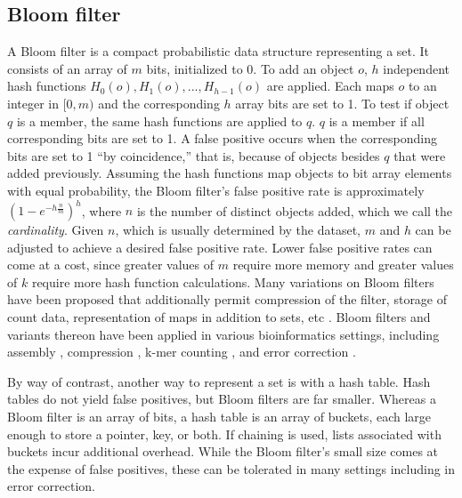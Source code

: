 \documentclass[10pt]{article}
\begin{document}
\subsection*{Bloom filter}
A Bloom filter \cite{bloom1970space} is a compact probabilistic data structure representing a set.  It consists of an array of $m$ bits, initialized to 0.  To add an object $o$, $h$ independent hash functions $H_0(o), H_1(o),...,H_{h-1}(o)$ are applied.  Each maps $o$ to an integer in $[0, m)$ and the corresponding $h$ array bits are set to 1. To test if object $q$ is a member, the same hash functions are applied to $q$.  $q$ is a member if all corresponding bits are set to 1.  A false positive occurs when the corresponding bits are set to 1 ``by coincidence,'' that is, because of objects besides $q$ that were added previously.  Assuming the hash functions map objects to bit array elements with equal probability, the Bloom filter's false positive rate is approximately $(1-e^{-h\frac{n}{m}})^h$, where $n$ is the number of distinct objects added, which we call the \emph{cardinality}.  Given $n$, which is usually determined by the dataset, $m$ and $h$ can be adjusted to achieve a desired false positive rate.  Lower false positive rates can come at a cost, since greater values of $m$ require more memory and greater values of $k$ require more hash function calculations.  Many variations on Bloom filters have been proposed that additionally permit compression of the filter, storage of count data, representation of maps in addition to sets, etc \cite{tarkoma2012theory}.  Bloom filters and variants thereon have been applied in various bioinformatics settings, including assembly \cite{pell2012scaling}, compression \cite{jones2012compression}, k-mer counting \cite{melsted2011efficient}, and error correction \cite{shi2010parallel}.

By way of contrast, another way to represent a set is with a hash table.  Hash tables do not yield false positives, but Bloom filters are far smaller.  Whereas a Bloom filter is an array of bits, a hash table is an array of buckets, each large enough to store a pointer, key, or both.  If chaining is used, lists associated with buckets incur additional overhead.  While the Bloom filter's small size comes at the expense of false positives, these can be tolerated in many settings including in error correction.
\end{document}
